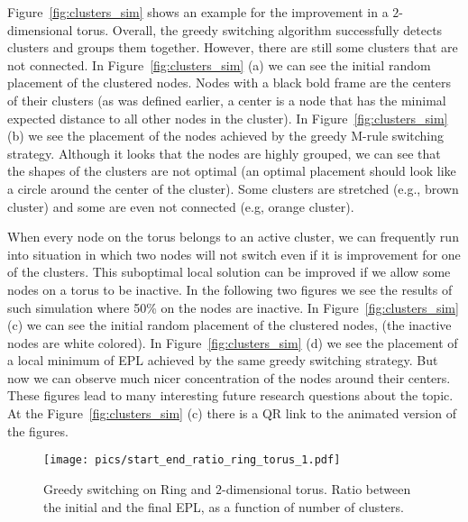\documentclass[conference]{IEEEtran}
\begin{document}
Figure~\ref{fig:clusters_sim} shows an example for the improvement in a $2$-dimensional torus.
Overall, the greedy switching algorithm successfully detects clusters and groups them together. However, there are still some clusters that are not connected. In Figure~\ref{fig:clusters_sim} (a) we can see the initial random placement of the clustered nodes. Nodes with a black bold frame are the centers of their clusters (as was defined earlier, a center is a node that has the minimal expected distance to all other nodes in the cluster). In Figure~\ref{fig:clusters_sim} (b) we see the placement of the nodes achieved by the greedy M-rule switching strategy. Although it looks that the nodes are highly grouped, we can see that the shapes of the clusters are not optimal (an optimal placement should look like a circle around the center of the cluster). Some clusters are stretched (e.g., brown cluster) and some are even not connected (e.g, orange cluster). 

When every node on the torus belongs to an active cluster, we can frequently run into situation in which two nodes will not switch even if it is improvement for one of the clusters. This suboptimal local solution can be improved if we allow some nodes on a torus to be inactive. In the following two figures we see the results of such simulation where 50\% on the nodes are inactive. In Figure~\ref{fig:clusters_sim} (c) we can see the initial random placement of the clustered nodes, (the inactive nodes are white colored). In Figure~\ref{fig:clusters_sim} (d) we see the placement of a local minimum of EPL achieved by the same greedy switching strategy. But now we can observe much nicer concentration of the nodes around their centers. These figures lead to many interesting future research questions about the topic. 
At the Figure~\ref{fig:clusters_sim} (c) there is a QR link to the animated version of the figures.

\begin{figure}
\begin{center}
\texttt{[image: pics/start\_end\_ratio\_ring\_torus\_1.pdf]}\end{center}
\caption{\label{fig:start_end_ratio_ring_torus_1}Greedy switching on Ring and $2$-dimensional torus. Ratio between the initial and the final EPL, as a function of number of clusters.}
\end{figure}
\end{document}
